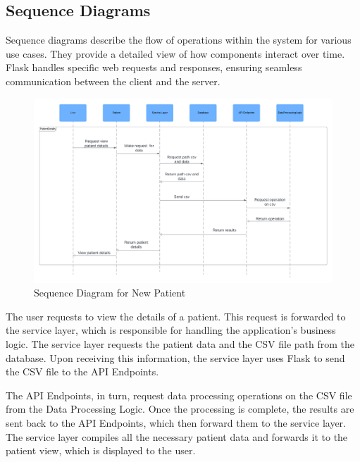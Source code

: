 \documentclass{article}
\begin{document}
\subsection{Sequence Diagrams}
Sequence diagrams describe the flow of operations within the system for various use cases. They provide a detailed view of how components interact over time. Flask handles specific web requests and responses, ensuring seamless communication between the client and the server.

\pagebreak

\begin{figure}[h]
\centering
\includegraphics[width=1.0\textwidth]{Images/Diagrams/sequence.png}
\caption{Sequence Diagram for New Patient}
\end{figure}

The user requests to view the details of a patient. This request is forwarded to the service layer, which is responsible for handling the application’s business logic. The service layer requests the patient data and the CSV file path from the database. Upon receiving this information, the service layer uses Flask to send the CSV file to the API Endpoints.

The API Endpoints, in turn, request data processing operations on the CSV file from the Data Processing Logic. Once the processing is complete, the results are sent back to the API Endpoints, which then forward them to the service layer. The service layer compiles all the necessary patient data and forwards it to the patient view, which is displayed to the user.
\end{document}
